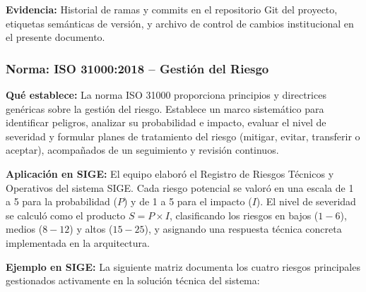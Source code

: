 \documentclass[12pt,a4paper]{article}
\begin{document}
\textbf{Evidencia:}
Historial de ramas y commits en el repositorio Git del proyecto, etiquetas semánticas de versión, y archivo de control de cambios institucional en el presente documento.

\subsubsection{Norma: ISO 31000:2018 -- Gestión del Riesgo}

\textbf{Qué establece:}
La norma ISO 31000 proporciona principios y directrices genéricas sobre la gestión del riesgo. Establece un marco sistemático para identificar peligros, analizar su probabilidad e impacto, evaluar el nivel de severidad y formular planes de tratamiento del riesgo (mitigar, evitar, transferir o aceptar), acompañados de un seguimiento y revisión continuos.

\textbf{Aplicación en SIGE:}
El equipo elaboró el Registro de Riesgos Técnicos y Operativos del sistema SIGE. Cada riesgo potencial se valoró en una escala de 1 a 5 para la probabilidad ($P$) y de 1 a 5 para el impacto ($I$). El nivel de severidad se calculó como el producto $S = P \times I$, clasificando los riesgos en bajos ($1-6$), medios ($8-12$) y altos ($15-25$), y asignando una respuesta técnica concreta implementada en la arquitectura.

\textbf{Ejemplo en SIGE:}
La siguiente matriz documenta los cuatro riesgos principales gestionados activamente en la solución técnica del sistema:
\end{document}
